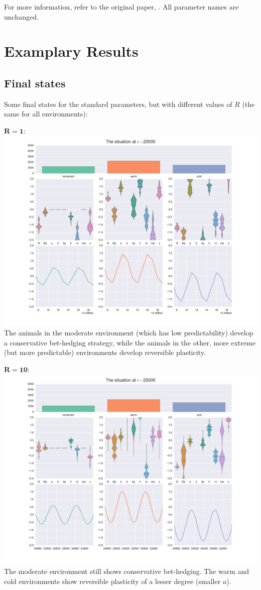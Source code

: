 \documentclass[
12pt, %
a4paper, %
headinclude,footinclude %
]{article}
\begin{document}
\noindent For more information, refer to the original paper, \cite{botero}. All parameter names are unchanged.
\section{Examplary Results}

\subsection{Final states}
Some final states for the standard parameters, but with different values of $R$ (the same for all environments):
\begin{description}
\item{$\mathbf{R=1}$:} \\
\includegraphics[width=\linewidth]{R1/end.png}
The animals in the moderate environment (which has low predictability) develop a conservative bet-hedging strategy, while the animals in the other, more extreme (but more predictable) environments develop reversible plasticity.

\item{$\mathbf{R=10}$:} \\
\includegraphics[width=\linewidth]{R10/end.png}
The moderate environment still shows conservative bet-hedging. The warm and cold environments show reversible plasticity of a lesser degree (smaller $a$).


\end{description}
\end{document}

